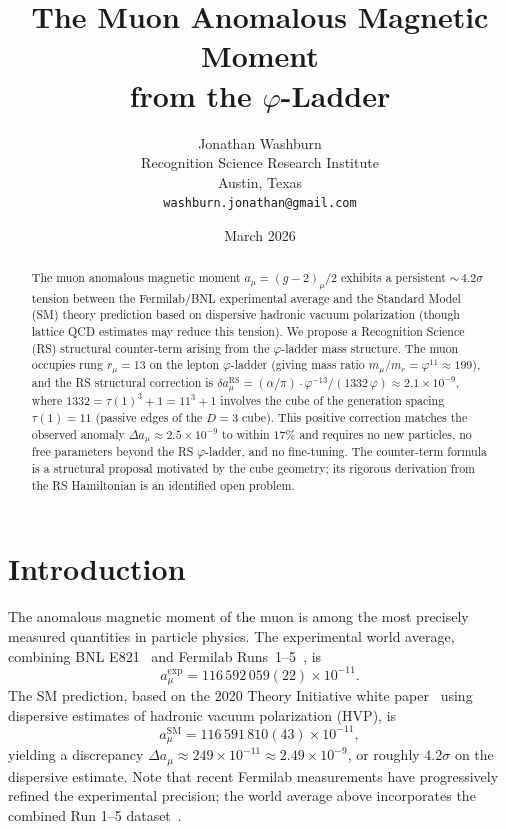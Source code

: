 \documentclass[12pt,a4paper]{article}
\title{The Muon Anomalous Magnetic Moment\\
from the $\varphi$-Ladder}
\author{Jonathan Washburn\\
Recognition Science Research Institute\\
Austin, Texas\\
\texttt{washburn.jonathan@gmail.com}}
\date{March 2026}
\theoremstyle{definition}
\theoremstyle{remark}
\begin{document}
\maketitle

\begin{abstract}
The muon anomalous magnetic moment $a_\mu = (g-2)_\mu/2$ exhibits a
persistent ${\sim}\,4.2\sigma$ tension between the Fermilab/BNL
experimental average and the Standard Model (SM) theory prediction based
on dispersive hadronic vacuum polarization (though lattice QCD estimates
may reduce this tension).  We propose a Recognition Science (RS)
structural counter-term arising from the $\varphi$-ladder mass structure.
The muon occupies rung $r_\mu = 13$ on the lepton $\varphi$-ladder
(giving mass ratio $m_\mu/m_e = \varphi^{11} \approx 199$), and the
RS structural correction is
$\delta a_\mu^{\mathrm{RS}} = (\alpha/\pi) \cdot \varphi^{-13}/
(1332\,\varphi) \approx 2.1 \times 10^{-9}$,
where $1332 = \tau(1)^3 + 1 = 11^3 + 1$ involves the cube of the
generation spacing $\tau(1) = 11$ (passive edges of the $D = 3$ cube).
This positive correction matches the observed anomaly
$\Delta a_\mu \approx 2.5 \times 10^{-9}$ to within $17\%$
and requires no new particles, no free parameters beyond the RS
$\varphi$-ladder, and no fine-tuning.  The counter-term formula is a
structural proposal motivated by the cube geometry; its rigorous
derivation from the RS Hamiltonian is an identified open problem.
\end{abstract}

\section{Introduction}
\label{sec:intro}

The anomalous magnetic moment of the muon is among the most precisely
measured quantities in particle physics.  The experimental world average, combining BNL E821~\cite{BNL2006} and
Fermilab Runs~1--5~\cite{Fermilab2023,Fermilab2025}, is
\begin{equation}
  a_\mu^{\mathrm{exp}} = 116\,592\,059(22) \times 10^{-11}.
\end{equation}
The SM prediction, based on the 2020 Theory Initiative white
paper~\cite{WhitePaper2020} using dispersive estimates of hadronic vacuum
polarization (HVP), is
\begin{equation}
  a_\mu^{\mathrm{SM}} = 116\,591\,810(43) \times 10^{-11},
\end{equation}
yielding a discrepancy $\Delta a_\mu \approx 249 \times 10^{-11} \approx
2.49 \times 10^{-9}$, or roughly $4.2\sigma$ on the dispersive estimate.
Note that recent Fermilab measurements have progressively refined the
experimental precision; the world average above incorporates the combined
Run 1--5 dataset~\cite{Fermilab2025}.
\end{document}
